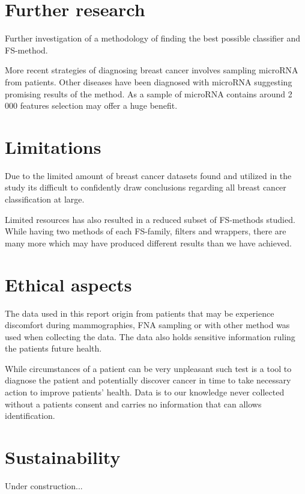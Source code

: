 \section{Further research}

Further investigation of a methodology of finding the best possible classifier and FS-method.

More recent strategies of diagnosing breast cancer involves sampling microRNA from patients. Other diseases have been diagnosed with microRNA suggesting promising results of the method. As a sample of microRNA contains around 2 000 features selection may offer a huge benefit.


\section{Limitations}

Due to the limited amount of breast cancer datasets found and utilized in the study its difficult to confidently draw conclusions regarding all breast cancer classification at large.

Limited resources has also resulted in a reduced subset of FS-methods studied. While having two methods of each FS-family, filters and wrappers, there are many more which may have produced different results than we have achieved.


\section{Ethical aspects}

The data used in this report origin from patients that may be experience discomfort during mammographies, FNA sampling or with other method was used when collecting the data. The data also holds sensitive information ruling the patients future health.

While circumstances of a patient can be very unpleasant such test is a tool to diagnose the patient and potentially discover cancer in time to take necessary action to improve patients' health. Data is to our knowledge never collected without a patients consent and carries no information that can allows identification.

\section{Sustainability}

Under construction...
